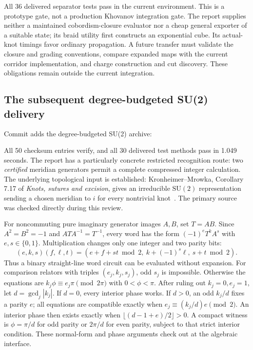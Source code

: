 All 36 delivered separator tests pass in the current environment. This is a
prototype gate, not a production Khovanov integration gate. The report supplies
neither a maintained cobordism-closure evaluator nor a cheap general exporter
of a suitable state; its braid utility first constructs an exponential cube.
Its actual-knot timings favor ordinary propagation. A future transfer must
validate the closure and grading conventions, compare expanded maps with the
current corridor implementation, and charge construction and cut discovery.
These obligations remain outside the current integration.

\subsection{The subsequent degree-budgeted SU(2) delivery}
Commit  adds the degree-budgeted SU(2) archive:
\begin{center}\small
{}
\end{center}
All 50 checksum entries verify,
and all 30 delivered test methods pass in 1.049 seconds. The report has a
particularly concrete restricted recognition route: two \emph{certified}
meridian generators permit a complete compressed integer calculation.
The underlying topological input is established: Kronheimer--Mrowka,
Corollary 7.17 of \emph{Knots, sutures and excision}, gives an irreducible
$\mathrm{SU}(2)$ representation sending a chosen meridian to $i$ for every
nontrivial knot~\cite{km-traceless-primary}. The primary source was checked
directly during this review.

For noncommuting pure imaginary generator images $A,B$, set $T=AB$.
Since $A^2=B^2=-1$ and $ATA^{-1}=T^{-1}$, every word has the form
$(-1)^e T^k A^s$ with $e,s\in\{0,1\}$. Multiplication changes only one integer
and two parity bits:
\[
 (e,k,s)(f,\ell,t)=(e+f+st\bmod2,\ k+(-1)^s\ell,\ s+t\bmod2).
\]
Thus a binary straight-line word circuit can be evaluated without expansion.
For comparison relators with triples $(e_j,k_j,s_j)$, odd $s_j$ is impossible.
Otherwise the equations are $k_j\phi\equiv e_j\pi\pmod{2\pi}$ with
$0<\phi<\pi$. After ruling out $k_j=0,e_j=1$, let $d=\gcd_j|k_j|$.
If $d=0$, every interior phase works. If $d>0$, an odd $k_j/d$ fixes a parity
$e$; all equations are compatible exactly when
$e_j\equiv(k_j/d)e\pmod2$. An interior phase then exists exactly when
$\lfloor(d-1+e)/2\rfloor>0$. A compact witness is $\phi=\pi/d$ for odd parity
or $2\pi/d$ for even parity, subject to that strict interior condition.
These normal-form and phase arguments check out at the algebraic interface.

